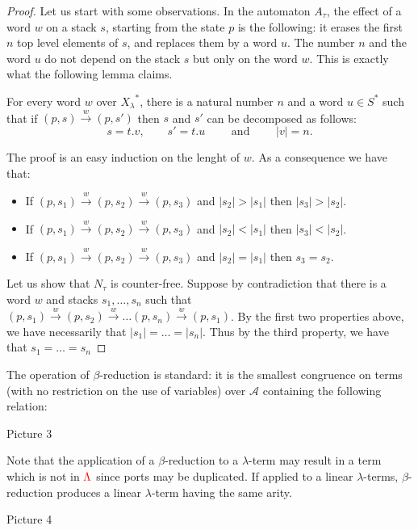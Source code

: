 \begin{proof}
Let us start with some observations. In the automaton $A_\tau$, the effect of a word $w$ on a stack $s$, starting from the state $p$ is the following: it erases the first $n$ top level elements of $s$, and replaces them by a word $u$. The number $n$ and the word $u$ do not depend on the stack $s$ but only on the word $w$. This is exactly what the following lemma claims.

\begin{lemma}
For every word $w$ over ${X_\lambda}^*$, there is a natural number $n$ and a word $u\in S^*$ such that if $(p,s)\xrightarrow{w}(p,s')$ then $s$ and $s'$ can be decomposed as follows:
$$s=t.v,\qquad s'=t.u\qquad \text{ and }\qquad |v|=n.$$
\end{lemma}
The proof is an easy induction on the lenght of $w$. As a consequence we have that:
\begin{itemize}
\item If $(p,s_1)\xrightarrow{w}(p,s_2)\xrightarrow{w}(p,s_3)$ and $|s_2|>|s_1|$ then $|s_3|>|s_2|$.
\item If $(p,s_1)\xrightarrow{w}(p,s_2)\xrightarrow{w}(p,s_3)$ and $|s_2|<|s_1|$ then $|s_3|<|s_2|$.
\item If $(p,s_1)\xrightarrow{w}(p,s_2)\xrightarrow{w}(p,s_3)$ and $|s_2|=|s_1|$ then $s_3 =s_2$.
\end{itemize}

Let us show that $N_\tau$ is counter-free. Suppose by contradiction that there is a word $w$ and stacks $s_1,\dots, s_n$ such that 
$(p,s_1)\xrightarrow{w}(p,s_2)\xrightarrow{w}\dots(p,s_n)\xrightarrow{w}(p,s_1)$. By the first two properties above, we have necessarily that $|s_1|=\dots=|s_n|$. Thus by the third property, we have that $s_1=\dots=s_n$
\end{proof}



 The operation of $\beta$-reduction is standard: it is the smallest congruence on terms (with no restriction on the use of variables) over $\mathcal{A}$ containing the following relation:
 \begin{center}
 Picture 3
 \end{center}
Note that the application of a $\beta$-reduction to a $\lambda$-term may result in a term which is not in ${\color{red}{\Lambda}}$ since ports may be duplicated. If applied to a linear $\lambda$-terms, $\beta$-reduction produces a linear $\lambda$-term having the same arity. 
\begin{center}
Picture 4
\end{center}

